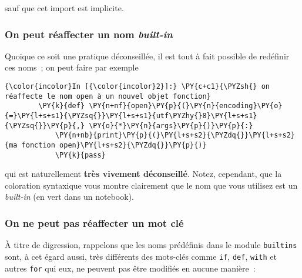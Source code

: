 sauf que cet import est implicite.

    \hypertarget{on-peut-ruxe9affecter-un-nom-built-in}{%
\subsubsection{\texorpdfstring{On peut réaffecter un nom
\emph{built-in}}{On peut réaffecter un nom built-in}}\label{on-peut-ruxe9affecter-un-nom-built-in}}

    Quoique ce soit une pratique déconseillée, il est tout à fait possible
de redéfinir ces noms~; on peut faire par exemple

    \begin{Verbatim}[commandchars=\\\{\},frame=single,framerule=0.3mm,rulecolor=\color{cellframecolor}]
{\color{incolor}In [{\color{incolor}2}]:} \PY{c+c1}{\PYZsh{} on réaffecte le nom open à un nouvel objet fonction}
        \PY{k}{def} \PY{n+nf}{open}\PY{p}{(}\PY{n}{encoding}\PY{o}{=}\PY{l+s+s1}{\PYZsq{}}\PY{l+s+s1}{utf\PYZhy{}8}\PY{l+s+s1}{\PYZsq{}}\PY{p}{,} \PY{o}{*}\PY{n}{args}\PY{p}{)}\PY{p}{:}
            \PY{n+nb}{print}\PY{p}{(}\PY{l+s+s2}{\PYZdq{}}\PY{l+s+s2}{ma fonction open}\PY{l+s+s2}{\PYZdq{}}\PY{p}{)}
            \PY{k}{pass}
\end{Verbatim}


    qui est naturellement \textbf{très vivement déconseillé}. Notez,
cependant, que la coloration syntaxique vous montre clairement que le
nom que vous utilisez est un \emph{built-in} (en vert dans un notebook).

    \hypertarget{on-ne-peut-pas-ruxe9affecter-un-mot-cluxe9}{%
\subsubsection{On ne peut pas réaffecter un mot
clé}\label{on-ne-peut-pas-ruxe9affecter-un-mot-cluxe9}}

    À titre de digression, rappelons que les noms prédéfinis dans le module
\texttt{builtins} sont, à cet égard aussi, très différents des mots-clés
comme \texttt{if}, \texttt{def}, \texttt{with} et autres \texttt{for}
qui eux, ne peuvent pas être modifiés en aucune manière~:

\begin{Shaded}
\begin{Highlighting}[frame=lines,framerule=0.6mm,rulecolor=\color{asisframecolor}]
\OperatorTok{>>>}  \OperatorTok{=} 
     \OperatorTok{=} 
           \OperatorTok{^}
\end{Highlighting}
\end{Shaded}

